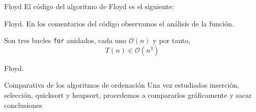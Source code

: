 \documentclass[10pt, xcolor=table]{beamer}
\begin{document}
\begin{frame}{Floyd}
El código del algoritmo de Floyd es el siguiente:

\end{frame}

\begin{frame}[fragile]{Floyd.
}
En los comentarios del código observamos el análisis de la función.

Son tres bucles \texttt{for} anidados, cada uno \(\mathcal{O}(n)\) y por tanto,
\[
	T(n) \in \mathcal{O}(n^3)
\]
\end{frame}

\begin{frame}{Floyd.
}
\begin{table}[h!]
	\centering
	\footnotesize
		\caption{Experiencia empírica de algoritmo de Floyd sin optimizar}
\end{table}
\end{frame}

\begin{frame}{Comparativa de los algoritmos de ordenación}
Una vez estudiados inserción, selección, quicksort y heapsort, procedemos a compararlos gráficamente y sacar conclusiones
\end{frame}
\end{document}
